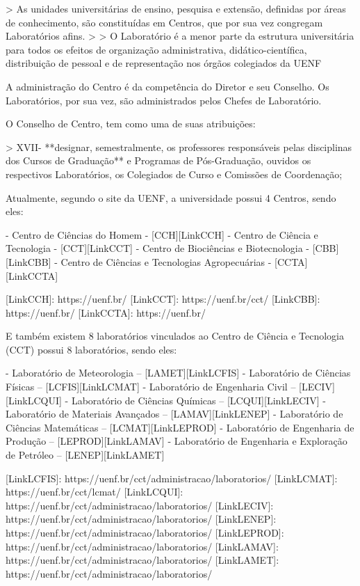 > As unidades universitárias de ensino, pesquisa e extensão, definidas por áreas de conhecimento, são constituídas em Centros, que por sua vez congregam Laboratórios afins.
>
> O Laboratório é a menor parte da estrutura universitária para todos os efeitos de organização administrativa, didático-científica, distribuição de pessoal e de representação nos órgãos colegiados da UENF

A administração do Centro é da competência do Diretor e seu Conselho. Os Laboratórios, por sua vez, são administrados pelos Chefes de Laboratório.

O Conselho de Centro, tem como uma de suas atribuições:

> XVII- **designar, semestralmente, os professores responsáveis pelas disciplinas dos Cursos de Graduação** e Programas de Pós-Graduação, ouvidos os respectivos Laboratórios, os Colegiados de Curso e Comissões de Coordenação;

Atualmente, segundo o site da UENF, a universidade possui 4 Centros, sendo eles:

- Centro de Ciências do Homem - [CCH][LinkCCH]
- Centro de Ciência e Tecnologia - [CCT][LinkCCT]
- Centro de Biociências e Biotecnologia - [CBB][LinkCBB]
- Centro de Ciências e Tecnologias Agropecuárias - [CCTA][LinkCCTA]

[LinkCCH]: https://uenf.br/
[LinkCCT]: https://uenf.br/cct/
[LinkCBB]: https://uenf.br/
[LinkCCTA]: https://uenf.br/

E também existem 8 laboratórios vinculados ao Centro de Ciência e Tecnologia (CCT) possui 8 laboratórios, sendo eles:

- Laboratório de Meteorologia – [LAMET][LinkLCFIS]
- Laboratório de Ciências Físicas – [LCFIS][LinkLCMAT]
- Laboratório de Engenharia Civil – [LECIV][LinkLCQUI]
- Laboratório de Ciências Químicas – [LCQUI][LinkLECIV]
- Laboratório de Materiais Avançados – [LAMAV][LinkLENEP]
- Laboratório de Ciências Matemáticas – [LCMAT][LinkLEPROD]
- Laboratório de Engenharia de Produção – [LEPROD][LinkLAMAV]
- Laboratório de Engenharia e Exploração de Petróleo – [LENEP][LinkLAMET]

[LinkLCFIS]: https://uenf.br/cct/administracao/laboratorios/
[LinkLCMAT]: https://uenf.br/cct/lcmat/
[LinkLCQUI]: https://uenf.br/cct/administracao/laboratorios/
[LinkLECIV]: https://uenf.br/cct/administracao/laboratorios/
[LinkLENEP]: https://uenf.br/cct/administracao/laboratorios/
[LinkLEPROD]: https://uenf.br/cct/administracao/laboratorios/
[LinkLAMAV]: https://uenf.br/cct/administracao/laboratorios/
[LinkLAMET]: https://uenf.br/cct/administracao/laboratorios/

